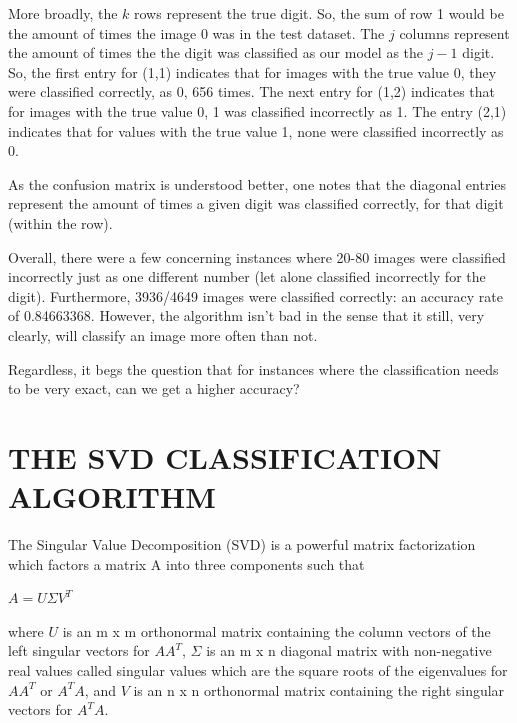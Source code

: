 \documentclass[dvipsnames,12pt]{article} %
\begin{document}
          \vskip 06pt

          \hskip 12pt More broadly, the $k$ rows represent the true digit. So, the sum of row 1 would be the amount of times the image 0 was in the test dataset. The $j$ columns represent the amount of times the the digit was classified as our model as the $j-1$ digit. So, the first entry for (1,1) indicates that for images with the true value 0, they were classified correctly, as 0, 656 times. The next entry for (1,2) indicates that for images with the true value 0, 1 was classified incorrectly as 1. The entry (2,1) indicates that for values with the true value 1, none were classified incorrectly as 0.

          \vskip 06pt

          \hskip 12pt As the confusion matrix is understood better, one notes that the diagonal entries represent the amount of times a given digit was classified correctly, for that digit (within the row). 

          \vskip 06pt

          \hskip 12pt Overall, there were a few concerning instances where 20-80 images were classified incorrectly just as one different number (let alone classified incorrectly for the digit). Furthermore, 3936/4649 images were classified correctly: an accuracy rate of 0.84663368. However, the algorithm isn't bad in the sense that it still, very clearly, will classify an image more often than not. 

          \vskip 06pt

          \hskip 12pt Regardless, it begs the question that for instances where the classification needs to be very exact, can we get a higher accuracy?

      \section{THE SVD CLASSIFICATION ALGORITHM}
        \label{SECT 04:SVD CLASSIFICATION ALGORITHM}

        \vspace{06pt}

        \hskip 12pt The Singular Value Decomposition (SVD) is a powerful matrix factorization which factors a matrix A into three components such that
        
        \begin{center}
            $A = U \Sigma V^T$
        \end{center}

        where $U$ is an m x m orthonormal matrix containing the column vectors of the left singular vectors for $AA^T$, $\Sigma$ is an m x n diagonal matrix with non-negative real values called singular values which are the square roots of the eigenvalues for $AA^T$ or $A^TA$, and $V$ is an n x n orthonormal matrix containing the right singular vectors for $A^TA$.
\end{document}
